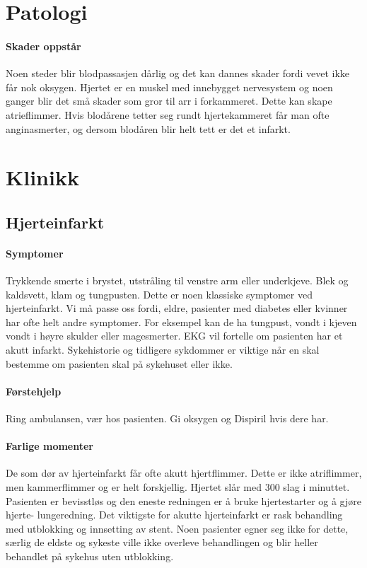 		\section{Patologi}	
			\paragraph{Skader oppstår\\}
				Noen steder blir blodpassasjen dårlig og det kan dannes skader fordi vevet ikke får nok oksygen. Hjertet er en muskel med innebygget nervesystem og noen ganger blir det små skader som gror til arr i forkammeret. Dette kan skape atrieflimmer\cite{!!!}. Hvis blodårene tetter seg rundt hjertekammeret får man ofte anginasmerter, og dersom blodåren blir helt tett er det et infarkt.
		\section{Klinikk}
			\subsection{Hjerteinfarkt}	
				\paragraph{Symptomer\\}
					Trykkende smerte i brystet, utstråling til venstre arm eller underkjeve. Blek og kaldsvett, klam og tungpusten. Dette er noen klassiske symptomer ved hjerteinfarkt. Vi må passe oss fordi, eldre, pasienter med diabetes eller kvinner har ofte helt andre symptomer. For eksempel kan de ha tungpust, vondt i kjeven vondt i høyre skulder eller magesmerter. EKG vil fortelle om pasienten har et akutt infarkt. Sykehistorie og tidligere sykdommer er viktige når en skal bestemme om pasienten skal på sykehuset eller ikke.
				\paragraph{Førstehjelp\\}
					Ring ambulansen, vær hos pasienten. Gi oksygen og Dispiril hvis dere har. 
				\paragraph{Farlige momenter\\}
					De som dør av hjerteinfarkt får ofte akutt hjertflimmer. Dette er ikke atriflimmer, men kammerflimmer og er helt forskjellig. Hjertet slår med 300 slag i minuttet. Pasienten er bevisstløs og den eneste redningen er å bruke hjertestarter og å gjøre hjerte- lungeredning. Det viktigste for akutte hjerteinfarkt er rask behandling med utblokking og innsetting av stent. Noen pasienter egner seg ikke for dette, særlig de eldste og sykeste ville ikke overleve behandlingen og blir heller behandlet på sykehus uten utblokking. 
